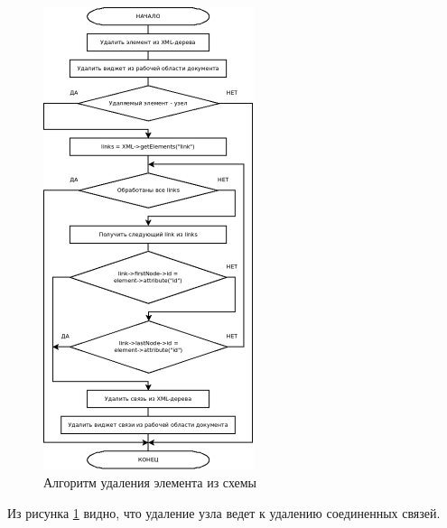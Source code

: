 \begin{figure}[H]
  \centering
  \includegraphics[width=0.55\textwidth]{diagrams/block-schemes/delete.png}
  \caption{Алгоритм удаления элемента из схемы}
  \label{fig:delete-node}
\end{figure}

Из рисунка \ref{fig:delete-node} видно, что удаление узла ведет к удалению соединенных связей.

